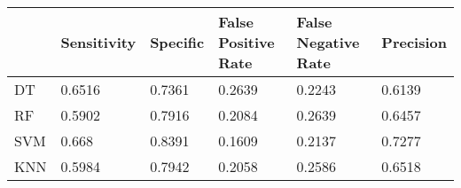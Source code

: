 \begin{table}[!h]
\begin{tabular}{l | l | l| l| l | l}
 & Sensitivity & Specific & False Positive Rate & False Negative Rate & Precision \\\hline
DT & 0.6516 & 0.7361 & 0.2639 & 0.2243 & 0.6139\\
RF & 0.5902 & 0.7916 & 0.2084 & 0.2639 & 0.6457\\
SVM & 0.668 & 0.8391 & 0.1609 & 0.2137 & 0.7277\\
KNN & 0.5984 & 0.7942 & 0.2058 & 0.2586 & 0.6518\\
\end{tabular}
\caption{}
\end{table}
